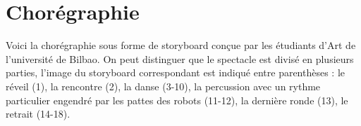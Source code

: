 
\section{Chorégraphie}
Voici la chorégraphie sous forme de storyboard conçue par les étudiants d'Art de l'université de Bilbao. On peut distinguer que le spectacle est divisé en plusieurs parties, l'image du storyboard correspondant est indiqué entre parenthèses : le réveil (1), la rencontre (2), la danse (3-10), la percussion avec un rythme particulier engendré par les pattes des robots (11-12), la dernière ronde (13), le retrait (14-18).

\hspace*{-2cm}
%

